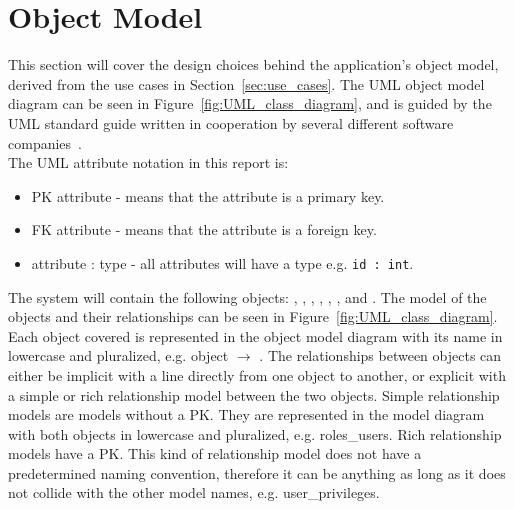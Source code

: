 \section{Object Model}
\label{section:uml_notation}
\label{subsec:objects}

This section will cover the design choices behind the application's object model, derived from the use cases in Section~\ref{sec:use_cases}.
The UML object model diagram can be seen in Figure~\ref{fig:UML_class_diagram}, and is guided by the UML standard guide written in cooperation by several different software companies~\citep{UML_notation}.\\

The UML attribute notation in this report is:
\begin{itemize}
    \item PK attribute - means that the attribute is a primary key.
    \item FK attribute - means that the attribute is a foreign key.
    \item attribute : type - all attributes will have a type e.g. \verb+id : int+.
\end{itemize}

The system will contain the following objects: , , , , , , and .
The model of the objects and their relationships can be seen in Figure~\ref{fig:UML_class_diagram}.
Each object covered is represented in the object model diagram with its name in lowercase and pluralized, e.g.  object $\rightarrow$ .
The relationships between objects can either be implicit with a line directly from one object to another, or explicit with a simple or rich relationship model between the two objects.
Simple relationship models are models without a PK. They are represented in the model diagram with both objects in lowercase and pluralized, e.g. roles\_users.
Rich relationship models have a PK. This kind of relationship model does not have a predetermined naming convention, therefore it can be anything as long as it does not collide with the other model names, e.g. user\_privileges.\\

